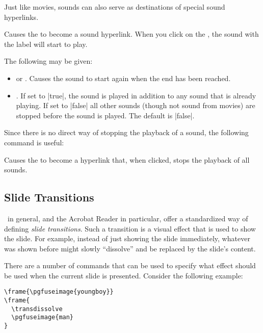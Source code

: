 Just like movies, sounds can also serve as  destinations of special sound hyperlinks.

\begin{command}{\hyperlinksound{}}
  Causes the  to become a sound hyperlink. When you click on the , the sound with the label  will start to play.

  The following  may be given:
  \begin{itemize}
  \item
     or . Causes the sound to start again when the end has been reached.
  \item
    . If set to |true|, the sound is played in addition to any sound that is already playing. If set to |false| all other sounds (though not sound from movies) are stopped before the sound is played. The default is |false|.
  \end{itemize}
\end{command}

Since there is no direct way of stopping the playback of a sound, the following command is useful:

\begin{command}{\hyperlinkmute{}}
  Causes the  to become a hyperlink that, when clicked, stops the playback of all sounds.
\end{command}


\subsection{Slide Transitions}

\pdf\ in general, and the Acrobat Reader in particular, offer a standardized way of defining \emph{slide transitions}. Such a transition is a visual effect that is used to show the slide. For example, instead of just showing the slide immediately, whatever was shown before might slowly ``dissolve'' and be replaced by the slide's content.

There are a number of commands that can be used to specify what effect should be used when the current slide is presented. Consider the following example:

\begin{verbatim}
\frame{\pgfuseimage{youngboy}}
\frame{
  \transdissolve
  \pgfuseimage{man}
}
\end{verbatim}

